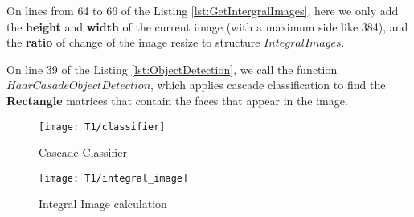 \noindent On lines from 64 to 66 of the Listing \ref{lst:GetIntergralImages}, here we only add the \textbf{height} and \textbf{width} of the current image (with a maximum side like 384), and the \textbf{ratio} of change of the image resize to structure $IntegralImages$.





\noindent On line 39 of the Listing \ref{lst:ObjectDetection}, we call the function $HaarCasadeObjectDetection$, which applies cascade classification to find the \textbf{Rectangle} matrices that contain the faces that appear in the image.

\begin{figure}[h]
	\centering
	\texttt{[image: T1/classifier]}
	\caption{Cascade Classifier}
	\label{fig:slideT1}
\end{figure}
\begin{figure}[h]
	\centering
	\texttt{[image: T1/integral\_image]}
	\caption{Integral Image calculation}
	\label{fig:integral}
\end{figure}
